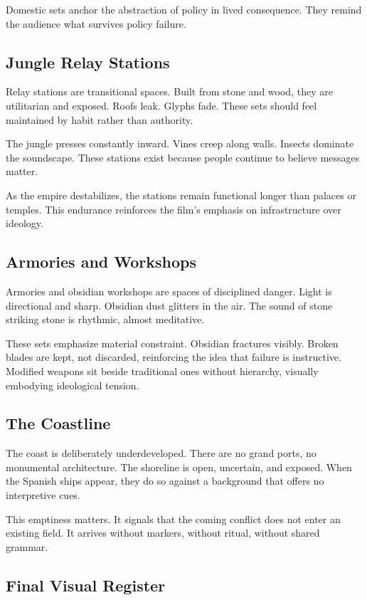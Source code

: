 \documentclass[12pt]{article}
\begin{document}
Domestic sets anchor the abstraction of policy in lived consequence. They remind the audience what survives policy failure.

\subsection*{Jungle Relay Stations}

Relay stations are transitional spaces. Built from stone and wood, they are utilitarian and exposed. Roofs leak. Glyphs fade. These sets should feel maintained by habit rather than authority.

The jungle presses constantly inward. Vines creep along walls. Insects dominate the soundscape. These stations exist because people continue to believe messages matter.

As the empire destabilizes, the stations remain functional longer than palaces or temples. This endurance reinforces the film's emphasis on infrastructure over ideology.

\subsection*{Armories and Workshops}

Armories and obsidian workshops are spaces of disciplined danger. Light is directional and sharp. Obsidian dust glitters in the air. The sound of stone striking stone is rhythmic, almost meditative.

These sets emphasize material constraint. Obsidian fractures visibly. Broken blades are kept, not discarded, reinforcing the idea that failure is instructive. Modified weapons sit beside traditional ones without hierarchy, visually embodying ideological tension.

\subsection*{The Coastline}

The coast is deliberately underdeveloped. There are no grand ports, no monumental architecture. The shoreline is open, uncertain, and exposed. When the Spanish ships appear, they do so against a background that offers no interpretive cues.

This emptiness matters. It signals that the coming conflict does not enter an existing field. It arrives without markers, without ritual, without shared grammar.

\subsection*{Final Visual Register}
\end{document}
